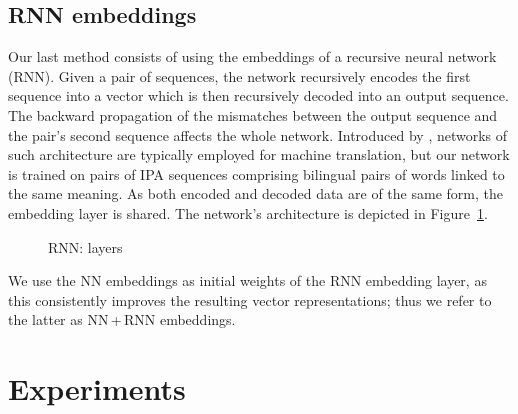 \documentclass[a4paper]{report}
\begin{document}
\section{RNN embeddings}

Our last method consists of using the embeddings of a recursive neural network (RNN).
Given a pair of sequences, the network recursively encodes the first sequence into a vector which is then recursively decoded into an output sequence.
The backward propagation of the mismatches between the output sequence and the pair's second sequence affects the whole network.
Introduced by \citet{2014_Cho_al}, networks of such architecture are typically employed for machine translation,
but our network is trained on pairs of IPA sequences comprising bilingual pairs of words linked to the same meaning.
As both encoded and decoded data are of the same form, the embedding layer is shared.
The network's architecture is depicted in Figure~\ref{fig:rnn}.

\begin{figure}[h]
	\centering\small


	\caption{RNN: layers}
	\label{fig:rnn}
\end{figure}

We use the NN embeddings as initial weights of the RNN embedding layer, as this consistently improves the resulting vector representations;
thus we refer to the latter as NN\,+\,RNN embeddings.


\chapter{Experiments}
\end{document}
